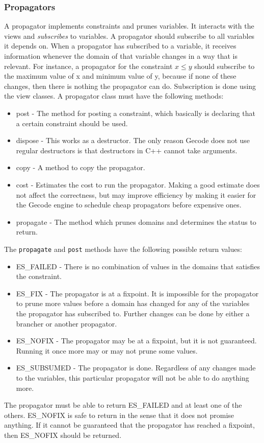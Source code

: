 \documentclass[a4paper,11pt]{article}
\begin{document}
\subsubsection{Propagators}
\label{sec:propagators}
A propagator implements constraints and prunes variables. It interacts with the views and \textit{subscribes} to variables. A propagator should subscribe to all variables it depends on. When a propagator has subscribed to a variable, it receives information whenever the domain of that variable changes in a way that is relevant. For instance, a propagator for the constraint $x\le y$ should subscribe to the maximum value of x and minimum value of y, because if none of these changes, then there is nothing the propagator can do. Subscription is done using the view classes. A propagator class must have the following methods:
\begin{itemize}
\item{post} - The method for posting a constraint, which basically is declaring that a certain constraint should be used.
\item{dispose} - This works as a destructor. The only reason Gecode does not use regular destructors is that destructors in C++ cannot take arguments.
\item{copy} - A method to copy the propagator.
\item{cost} - Estimates the cost to run the propagator. Making a good estimate does not affect the correctness, but may improve efficiency by making it easier for the Gecode engine to schedule cheap propagators before expensive ones.
\item{propagate} - The method which prunes domains and determines the status to return.
\end{itemize}
The \texttt{propagate} and \texttt{post} methods have the following possible return values:
\begin{itemize}
\item{ES\_FAILED} - There is no combination of values in the domains that satisfies the constraint. 
\item{ES\_FIX} - The propagator is at a fixpoint. It is impossible for the propagator to prune more values before a domain has changed for any of the variables the propagator has subscribed to. Further changes can be done by either a brancher or another propagator.
\item{ES\_NOFIX} - The propagator may be at a fixpoint, but it is not guaranteed. Running it once more may or may not prune some values. 
\item{ES\_SUBSUMED} - The propagator is done. Regardless of any changes made to the variables, this particular propagator will not be able to do anything more.
\end{itemize}
The propagator must be able to return ES\_FAILED and at least one of the others. ES\_NOFIX is safe to return in the sense that it does not promise anything. If it cannot be guaranteed that the propagator has reached a fixpoint, then ES\_NOFIX should be returned. 
\end{document}
